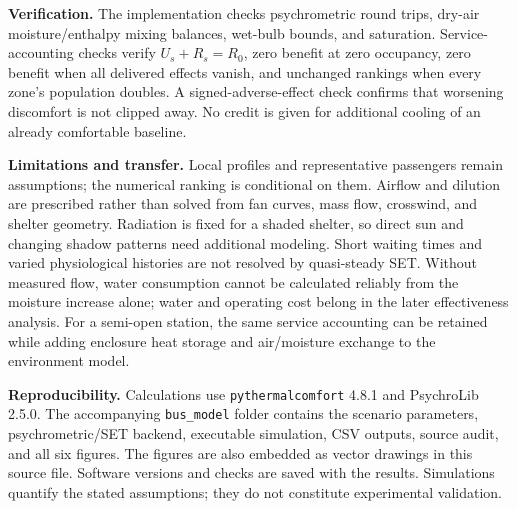 \documentclass[12pt]{article}
\begin{document}
\noindent\textbf{Verification.} The implementation checks psychrometric round trips, dry-air moisture/enthalpy mixing balances, wet-bulb bounds, and saturation. Service-accounting checks verify $U_s+R_s=R_0$, zero benefit at zero occupancy, zero benefit when all delivered effects vanish, and unchanged rankings when every zone's population doubles. A signed-adverse-effect check confirms that worsening discomfort is not clipped away. No credit is given for additional cooling of an already comfortable baseline.

\noindent\textbf{Limitations and transfer.} Local profiles and representative passengers remain assumptions; the numerical ranking is conditional on them. Airflow and dilution are prescribed rather than solved from fan curves, mass flow, crosswind, and shelter geometry. Radiation is fixed for a shaded shelter, so direct sun and changing shadow patterns need additional modeling. Short waiting times and varied physiological histories are not resolved by quasi-steady SET. Without measured flow, water consumption cannot be calculated reliably from the moisture increase alone; water and operating cost belong in the later effectiveness analysis. For a semi-open station, the same service accounting can be retained while adding enclosure heat storage and air/moisture exchange to the environment model.

\noindent\textbf{Reproducibility.} Calculations use \texttt{pythermalcomfort} 4.8.1 and PsychroLib 2.5.0. The accompanying \texttt{bus\_model} folder contains the scenario parameters, psychrometric/SET backend, executable simulation, CSV outputs, source audit, and all six figures. The figures are also embedded as vector drawings in this source file. Software versions and checks are saved with the results. Simulations quantify the stated assumptions; they do not constitute experimental validation.
\end{document}
